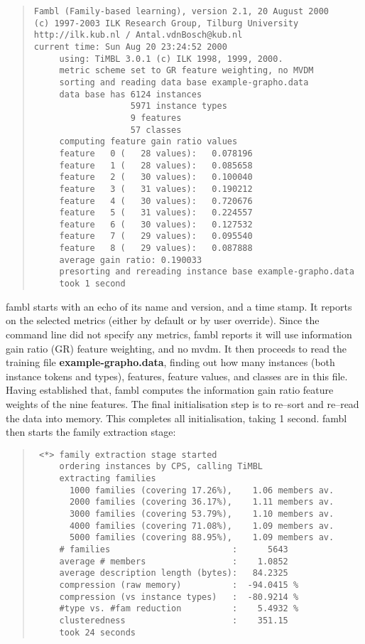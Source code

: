 \documentclass[11pt]{article}
\begin{document}
\begin{quote}
{\tiny
\begin{verbatim}
Fambl (Family-based learning), version 2.1, 20 August 2000
(c) 1997-2003 ILK Research Group, Tilburg University
http://ilk.kub.nl / Antal.vdnBosch@kub.nl
current time: Sun Aug 20 23:24:52 2000
     using: TiMBL 3.0.1 (c) ILK 1998, 1999, 2000.
     metric scheme set to GR feature weighting, no MVDM
     sorting and reading data base example-grapho.data
     data base has 6124 instances
                   5971 instance types
                   9 features
                   57 classes
     computing feature gain ratio values
     feature   0 (   28 values):   0.078196
     feature   1 (   28 values):   0.085658
     feature   2 (   30 values):   0.100040
     feature   3 (   31 values):   0.190212
     feature   4 (   30 values):   0.720676
     feature   5 (   31 values):   0.224557
     feature   6 (   30 values):   0.127532
     feature   7 (   29 values):   0.095540
     feature   8 (   29 values):   0.087888
     average gain ratio: 0.190033
     presorting and rereading instance base example-grapho.data
     took 1 second
\end{verbatim}
}
\end{quote}

{\sc fambl} starts with an echo of its name and version, and a time
stamp. It reports on the selected metrics (either by default or by
user override). Since the command line did not specify any metrics,
{\sc fambl} reports it will use information gain ratio (GR) feature
weighting, and no {\sc mvdm}. It then proceeds to read the training
file {\bf example-grapho.data}, finding out how many instances (both
instance tokens and types), features, feature values, and classes are
in this file. Having established that, {\sc fambl} computes the
information gain ratio feature weights of the nine features. The final
initialisation step is to re--sort and re--read the data into
memory. This completes all initialisation, taking 1 second. {\sc
fambl} then starts the family extraction stage:

\begin{quote}
{\tiny
\begin{verbatim}
 <*> family extraction stage started
     ordering instances by CPS, calling TiMBL
     extracting families
       1000 families (covering 17.26%),    1.06 members av.
       2000 families (covering 36.17%),    1.11 members av.
       3000 families (covering 53.79%),    1.10 members av.
       4000 families (covering 71.08%),    1.09 members av.
       5000 families (covering 88.95%),    1.09 members av.
     # families                        :      5643
     average # members                 :    1.0852
     average description length (bytes):   84.2325
     compression (raw memory)          :  -94.0415 %
     compression (vs instance types)   :  -80.9214 %
     #type vs. #fam reduction          :    5.4932 %
     clusteredness                     :    351.15
     took 24 seconds
\end{verbatim}
}
\end{quote}
\end{document}
